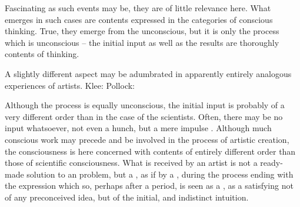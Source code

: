 Fascinating as such events may be, they are of little relevance here. 
What emerges in such cases are  contents expressed
 in the categories of conscious thinking.  True, they emerge from
the unconscious, but it is only the process which is unconscious -- the initial
input as well as the results are thoroughly  contents of
 thinking.

A slightly different aspect may be adumbrated in apparently entirely analogous
experiences of artists.  Klee:   Pollock: 

Although the process is equally unconscious, the initial input is
probably of a very different order than in the case of the scientists. 
Often, there may be no input whatsoever, not even a hunch, but a mere impulse
.  Although much conscious work may precede and
be involved in the process of artistic creation, the consciousness is
here concerned with contents of entirely different order than those of
scientific consciousness.  What is received by an artist is not a
ready-made solution to an  problem, but a ,
as if by a , during the process ending with the
 expression which so, perhaps after a 
period, is seen as a , as a satisfying 
not of any preconceived idea, but of the initial,  and
indistinct intuition. 

